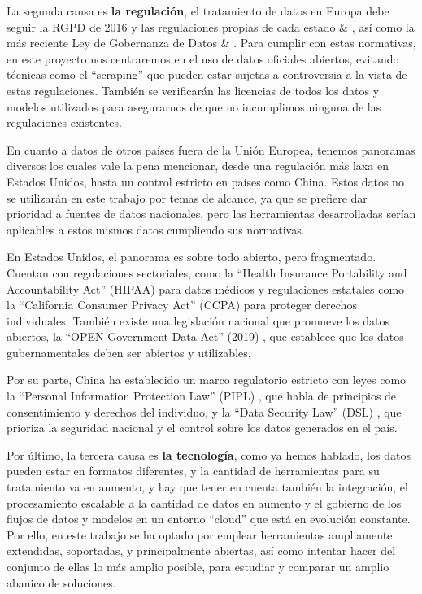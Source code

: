 	La segunda causa es \textbf{la regulación}, el tratamiento de datos en Europa debe seguir la RGPD de 2016 y las regulaciones propias de cada estado \citep{LicenciasLibres2017Datos} \& \citep{webRGPD2016Europa}, así como la más reciente Ley de Gobernanza de Datos \citep{webLGD2023Europa} \& \citep{DatosAbiertos2022Cloud}. Para cumplir con estas normativas, en este proyecto nos centraremos en el uso de datos oficiales abiertos, evitando técnicas como el ``scraping'' que pueden estar sujetas a controversia a la vista de estas regulaciones. También se verificarán las licencias de todos los datos y modelos utilizados para asegurarnos de que no incumplimos ninguna de las regulaciones existentes.
	
	En cuanto a datos de otros países fuera de la Unión Europea, tenemos panoramas diversos los cuales vale la pena mencionar, desde una regulación más laxa en Estados Unidos, hasta un control estricto en países como China. Estos datos no se utilizarán en este trabajo por temas de alcance, ya que se prefiere dar prioridad a fuentes de datos nacionales, pero las herramientas desarrolladas serían aplicables a estos mismos datos cumpliendo sus normativas.
	
	En Estados Unidos, el panorama es sobre todo abierto, pero fragmentado. Cuentan con regulaciones sectoriales, como la ``Health Insurance Portability and Accountability Act'' (HIPAA) para datos médicos \citep{webHIPAA1996EEUU} y regulaciones estatales como la ``California Consumer Privacy Act'' (CCPA) \citep{webCCPA2018California} para proteger derechos individuales. También existe una legislación nacional que promueve los datos abiertos, la ``OPEN Government Data Act'' (2019) \citep{webOGDA2019EEUU}, que establece que los datos gubernamentales deben ser abiertos y utilizables.
	
	Por su parte, China ha establecido un marco regulatorio estricto con leyes como la ``Personal Information Protection Law'' (PIPL) \citep{webPIPL2021China}, que habla de principios de consentimiento y derechos del individuo, y la ``Data Security Law'' (DSL) \citep{webDSL2021China}, que prioriza la seguridad nacional y el control sobre los datos generados en el país.
	
	
	Por último, la tercera causa es \textbf{la tecnología}, como ya hemos hablado, los datos pueden estar en formatos diferentes, y la cantidad de herramientas para su tratamiento va en aumento, y hay que tener en cuenta también la integración, el procesamiento escalable a la cantidad de datos en aumento y el gobierno de los flujos de datos y modelos en un entorno ``cloud'' que está en evolución constante. Por ello, en este trabajo se ha optado por emplear herramientas ampliamente extendidas, soportadas, y principalmente abiertas, así como intentar hacer del conjunto de ellas lo más amplio posible, para estudiar y comparar un amplio abanico de soluciones. \\

